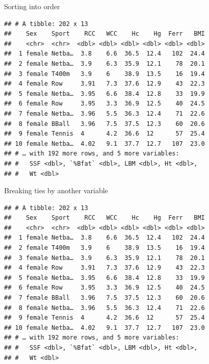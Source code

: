 \documentclass[
  ignorenonframetext,
]{beamer}
\newenvironment{Shaded}{\begin{snugshade}}{\end{snugshade}}
\newcommand{\KeywordTok}[1]{\textcolor[rgb]{0.13,0.29,0.53}{\textbf{#1}}}
\newcommand{\NormalTok}[1]{#1}
\newcommand{\OperatorTok}[1]{\textcolor[rgb]{0.81,0.36,0.00}{\textbf{#1}}}
\newcommand{\StringTok}[1]{\textcolor[rgb]{0.31,0.60,0.02}{#1}}
\begin{document}
\begin{frame}[fragile]{Sorting into order}
\protect\hypertarget{sorting-into-order}{}

\begin{Shaded}
\end{Shaded}

\begin{verbatim}
## # A tibble: 202 x 13
##    Sex    Sport    RCC   WCC    Hc    Hg  Ferr   BMI
##    <chr>  <chr>  <dbl> <dbl> <dbl> <dbl> <dbl> <dbl>
##  1 female Netba…  3.8    6.6  36.5  12.4   102  24.4
##  2 female Netba…  3.9    6.3  35.9  12.1    78  20.1
##  3 female T400m   3.9    6    38.9  13.5    16  19.4
##  4 female Row     3.91   7.3  37.6  12.9    43  22.3
##  5 female Netba…  3.95   6.6  38.4  12.8    33  19.9
##  6 female Row     3.95   3.3  36.9  12.5    40  24.5
##  7 female Netba…  3.96   5.5  36.3  12.4    71  22.6
##  8 female BBall   3.96   7.5  37.5  12.3    60  20.6
##  9 female Tennis  4      4.2  36.6  12      57  25.4
## 10 female Netba…  4.02   9.1  37.7  12.7   107  23.0
## # … with 192 more rows, and 5 more variables:
## #   SSF <dbl>, `%Bfat` <dbl>, LBM <dbl>, Ht <dbl>,
## #   Wt <dbl>
\end{verbatim}

\end{frame}

\begin{frame}[fragile]{Breaking ties by another variable}
\protect\hypertarget{breaking-ties-by-another-variable}{}

\begin{Shaded}
\end{Shaded}

\begin{verbatim}
## # A tibble: 202 x 13
##    Sex    Sport    RCC   WCC    Hc    Hg  Ferr   BMI
##    <chr>  <chr>  <dbl> <dbl> <dbl> <dbl> <dbl> <dbl>
##  1 female Netba…  3.8    6.6  36.5  12.4   102  24.4
##  2 female T400m   3.9    6    38.9  13.5    16  19.4
##  3 female Netba…  3.9    6.3  35.9  12.1    78  20.1
##  4 female Row     3.91   7.3  37.6  12.9    43  22.3
##  5 female Netba…  3.95   6.6  38.4  12.8    33  19.9
##  6 female Row     3.95   3.3  36.9  12.5    40  24.5
##  7 female BBall   3.96   7.5  37.5  12.3    60  20.6
##  8 female Netba…  3.96   5.5  36.3  12.4    71  22.6
##  9 female Tennis  4      4.2  36.6  12      57  25.4
## 10 female Netba…  4.02   9.1  37.7  12.7   107  23.0
## # … with 192 more rows, and 5 more variables:
## #   SSF <dbl>, `%Bfat` <dbl>, LBM <dbl>, Ht <dbl>,
## #   Wt <dbl>
\end{verbatim}

\end{frame}
\end{document}
